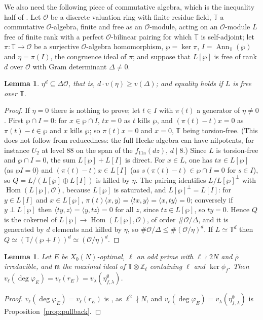 \documentclass[11pt]{amsart}
\newtheorem{lemma}[theorem]{Lemma}
\theoremstyle{definition}
\newcommand{\Z}{\mathbb{Z}}
\newcommand{\T}{\mathbb{T}}
\newcommand{\degphi}{\deg\varphi_E}
\begin{document}
We also need the following piece of commutative algebra, which is the inequality half of \cite[Lemma 4.17]{DDT}. Let $\mathcal{O}$ be a discrete valuation ring with finite residue field, $\T$ a commutative $\mathcal{O}$-algebra, finite and free as an $\mathcal{O}$-module, acting on an $\mathcal{O}$-module $L$ free of finite rank with a perfect $\mathcal{O}$-bilinear pairing for which $\T$ is self-adjoint; let $\pi\colon\T\to\mathcal{O}$ be a surjective $\mathcal{O}$-algebra homomorphism, $\wp=\ker\pi$, $I=\operatorname{Ann}_\T(\wp)$ and $\eta=\pi(I)$, the congruence ideal of $\pi$; and suppose that $L[\wp]$ is free of rank $d$ over $\mathcal{O}$ with Gram determinant $\Delta\ne0$.

\begin{lemma}\label{lem:ddt417}
$\eta^d\subseteq\Delta\mathcal{O}$, that is, $d\cdot v(\eta)\ge v(\Delta)$; and equality holds if $L$ is free over $\T$.
\end{lemma}
\begin{proof}
If $\eta=0$ there is nothing to prove; let $t\in I$ with $\pi(t)$ a generator of $\eta\ne0$. First $\wp\cap I=0$: for $x\in\wp\cap I$, $tx=0$ as $t$ kills $\wp$, and $(\pi(t)-t)x=0$ as $\pi(t)-t\in\wp$ and $x$ kills $\wp$; so $\pi(t)x=0$ and $x=0$, $\T$ being torsion-free. (This does not follow from reducedness: the full Hecke algebra can have nilpotents, for instance $U_2$ at level $88$ on the span of the $f_{\text{11a}}(dz)$, $d\mid8$.) Since $L$ is torsion-free and $\wp\cap I=0$, the sum $L[\wp]+L[I]$ is direct. For $x\in L$, one has $tx\in L[\wp]$ (as $\wp I=0$) and $(\pi(t)-t)x\in L[I]$ (as $s(\pi(t)-t)\in\wp\cap I=0$ for $s\in I$), so $Q=L/(L[\wp]\oplus L[I])$ is killed by $\eta$. The pairing identifies $L/L[\wp]^\perp$ with $\operatorname{Hom}(L[\wp],\mathcal{O})$, because $L[\wp]$ is saturated, and $L[\wp]^\perp=L[I]$: for $y\in L[I]$ and $x\in L[\wp]$, $\pi(t)\langle x,y\rangle=\langle tx,y\rangle=\langle x,ty\rangle=0$; conversely if $y\perp L[\wp]$ then $\langle ty,z\rangle=\langle y,tz\rangle=0$ for all $z$, since $tz\in L[\wp]$, so $ty=0$. Hence $Q$ is the cokernel of $L[\wp]\to\operatorname{Hom}(L[\wp],\mathcal{O})$, of order $\#\mathcal{O}/\Delta$, and it is generated by $d$ elements and killed by $\eta$, so $\#\mathcal{O}/\Delta\le\#(\mathcal{O}/\eta)^d$. If $L\simeq\T^d$ then $Q\simeq(\T/(\wp+I))^d\simeq(\mathcal{O}/\eta)^d$.
\end{proof}

\begin{lemma}\label{lem:hecke}
Let $E$ be $X_0(N)$-optimal, $\ell$ an odd prime with $\ell\nmid 2N$ and $\bar\rho$ irreducible, and $\mathfrak m$ the maximal ideal of $\T\otimes\Z_\ell$ containing $\ell$ and $\ker\phi_f$. Then $v_\ell(\degphi)=v_\ell(r_E)=v_\lambda(\eta^\emptyset_{f,\lambda})$.
\end{lemma}
\begin{proof}
$v_\ell(\degphi)=v_\ell(r_E)$ is \cite[Theorem 2.2]{ARS12}, as $\ell^2\nmid N$, and $v_\ell(\degphi)=v_\lambda(\eta^\emptyset_{f,\lambda})$ is Proposition~\ref{prop:pullback}.
\end{proof}
\end{document}
